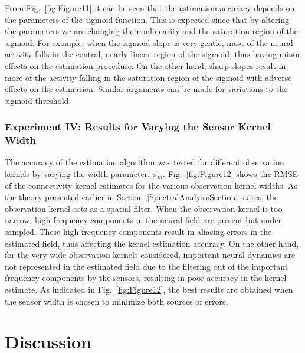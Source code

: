 \documentclass[review,authoryear,3p]{elsarticle}
\begin{document}
From Fig.~\ref{fig:Figure11} it can be seen that the estimation accuracy depends on the parameters of the sigmoid function. This is expected since that by altering the parameters we are changing the nonlinearity and the saturation region of the sigmoid. For example, when the sigmoid slope is very gentle, most of the neural activity falls in the central, nearly linear region of the sigmoid, thus having minor effects on the estimation procedure. On the other hand, sharp slopes result in more of the activity falling in the saturation region of the sigmoid with adverse effects on the estimation. Similar arguments can be made for variations to the sigmoid threshold.

\subsubsection{Experiment IV: Results for Varying the Sensor Kernel Width}
The accuracy of the estimation algorithm was tested for different observation kernels by varying the width parameter, $\sigma_m$. Fig.~\ref{fig:Figure12} shows the RMSE of the connectivity kernel estimates for the various observation kernel widths. As the theory presented earlier in Section~\ref{SpectralAnalysisSection} states, the observation kernel acts as a spatial filter. When the observation kernel is too narrow, high frequency components in the neural field are present but under sampled. These high frequency components result in aliasing errors in the estimated field, thus affecting the kernel estimation accuracy. On the other hand, for the very wide observation kernels considered, important neural dynamics are not represented in the estimated field due to the filtering out of the important frequency components by the sensors, resulting in poor accuracy in the kernel estimate. As indicated in Fig.~\ref{fig:Figure12}, the best results are obtained when the sensor width is chosen to minimize both sources of errors.

\section{Discussion}\label{DiscussionSection}
\end{document}
